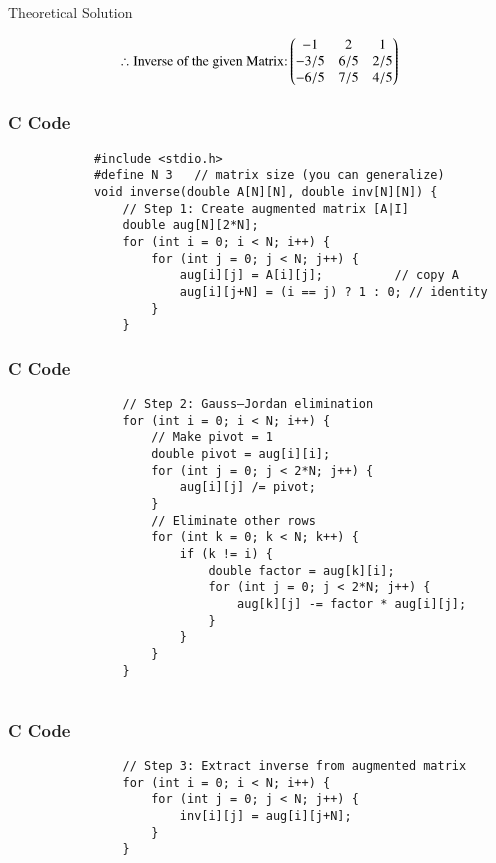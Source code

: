 \documentclass{beamer}
\begin{document}
	\begin{frame}{Theoretical Solution}
		
	\begin{align}
		\therefore \text{Inverse of the given Matrix:}\begin{pmatrix}-1 & 2 & 1 \\-3/5 & 6/5 & 2/5\\-6/5 & 7/5 & 4/5\end{pmatrix}
	\end{align}
	\end{frame}
	
	\begin{frame}[fragile]
		\frametitle{C Code }
		
		\begin{lstlisting}
			#include <stdio.h>
			#define N 3   // matrix size (you can generalize)
			void inverse(double A[N][N], double inv[N][N]) {
				// Step 1: Create augmented matrix [A|I]
				double aug[N][2*N];
				for (int i = 0; i < N; i++) {
					for (int j = 0; j < N; j++) {
						aug[i][j] = A[i][j];          // copy A
						aug[i][j+N] = (i == j) ? 1 : 0; // identity
					}
				}
			\end{lstlisting}
		\end{frame}
		\begin{frame}[fragile]
			\frametitle{C Code}
			
			\begin{lstlisting}
				// Step 2: Gauss–Jordan elimination
				for (int i = 0; i < N; i++) {
					// Make pivot = 1
					double pivot = aug[i][i];
					for (int j = 0; j < 2*N; j++) {
						aug[i][j] /= pivot;
					}
					// Eliminate other rows
					for (int k = 0; k < N; k++) {
						if (k != i) {
							double factor = aug[k][i];
							for (int j = 0; j < 2*N; j++) {
								aug[k][j] -= factor * aug[i][j];
							}
						}
					}
				}
				
			\end{lstlisting}
		\end{frame}
		\begin{frame}[fragile]
			\frametitle{C Code}
			
			\begin{lstlisting}
				// Step 3: Extract inverse from augmented matrix
				for (int i = 0; i < N; i++) {
					for (int j = 0; j < N; j++) {
						inv[i][j] = aug[i][j+N];
					}
				}
				
				
			\end{lstlisting}
		\end{frame}
		
\end{document}

